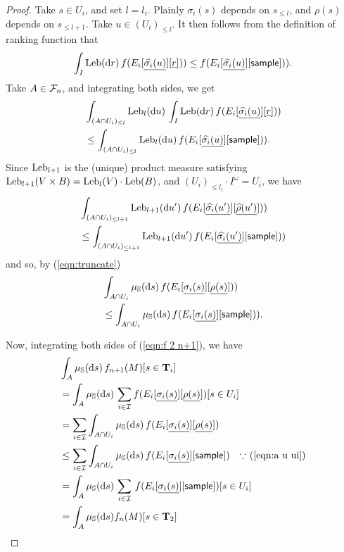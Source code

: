 \begin{proof}
Take $s \in U_i$, and set $l = l_i$.
Plainly $\sigma_i(s)$ depends on $s_{\leq l}$, and $\rho(s)$ depends on $s_{\leq l +1}$.
Take $u \in (U_i)_{\leq l}$.
It then follows from the definition of ranking function that
\[%
\int_I \Leb(\dif r) \, f(E_i[\underline{\widehat{\sigma_i}(u)}][\underline{r}])) \leq f(E_i[\underline{\widehat{\sigma_i}(u)}][\tsample])).
\]
Take $A \in \mathcal{F}_n$, and integrating both sides, we get
\begin{align*}
& \int_{(A \cap U_i)_{\leq l}} \mathrm{Leb}_l(\mathrm{d} u) \, \int_I \textrm{Leb}(\mathrm{d} r) \, f(E_i[\underline{\widehat{\sigma_i}(u)}][\underline{r}])) \\
& \leq \int_{(A \cap U_i)_{\leq l}} \mathrm{Leb}_l(\mathrm{d} u) \, f(E_i[\underline{\widehat{\sigma_i}(u)}][\mathsf{sample}])).
\end{align*}
Since $\mathrm{Leb}_{l+1}$ is the (unique) product measure satisfying $\mathrm{Leb}_{l+1}(V \times B) = \mathrm{Leb}_l(V) \cdot \mathrm{Leb}(B)$, and $(U_i)_{\leq l_i} \cdot I^\omega = U_i$, we have
\begin{align*}
& \int_{(A \cap U_i)_{\leq l+1}} \mathrm{Leb}_{l+1}(\mathrm{d} u') \, f(E_i[\underline{\widehat{\sigma_i}(u')}][\underline{\widehat{\rho}(u')}])) \\
& \leq 
\int_{(A \cap U_i)_{\leq l+1}} \mathrm{Leb}_{l+1}(\mathrm{d} u') \, f(E_i[\underline{\widehat{\sigma_i}(u')}][\mathsf{sample}]))
\end{align*}
and so, by (\ref{eqn:truncate})
\begin{align}
& \int_{A \cap U_i} \mu_{\entrosp}(\dif s) \, f(E_i[\underline{\sigma_i(s)}][\underline{\rho(s)}])) \nonumber \\
& \leq 
\int_{A \cap U_i} \mu_{\entrosp}(\dif s) \, f(E_i[\underline{\sigma_i(s)}][\tsample])).
\label{eqn:a u ui}
\end{align}

Now, integrating both sides of (\ref{eqn:f 2 n+1}), we have
\begin{align*}
& \int_A \mu_{{\mathbb{S}}}(\mathrm{d} s) \, f_{n+1}(M)[s \in \mathbf{T}_i] \\
&= 
\int_A \mu_{{\mathbb{S}}}(\mathrm{d} s) \, \sum_{i \in \mathcal{I}} f(E_i[\underline{\sigma_i(s)}][\underline{\rho(s)}])[s \in U_i] \\
&= 
\sum_{i \in \mathcal{I}} \int_{A \cap U_i} \mu_{{\mathbb{S}}}(\mathrm{d} s) \, f(E_i[\underline{\sigma_i(s)}][\underline{\rho(s)}])\\
&\leq 
\sum_{i \in \mathcal{I}} \int_{A \cap U_i} \mu_{{\mathbb{S}}}(\mathrm{d} s) \, f(E_i[\underline{\sigma_i(s)}][\mathsf{sample}])
\quad \hbox{$\because$ (\ref{eqn:a u ui})}\\
&= 
\int_{A} \mu_{{\mathbb{S}}}(\mathrm{d} s) \, \sum_{i \in \mathcal{I}} \, f(E_i[\underline{\sigma_i(s)}][\mathsf{sample}])[s \in U_i]\\
&= \int_{A} \mu_{{\mathbb{S}}}(\mathrm{d} s) f_{n}(M)[s \in \mathbf{T}_2]
\end{align*}

\end{proof}


